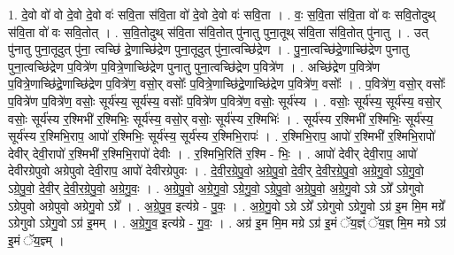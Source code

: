 \documentclass[17pt]{extarticle}
\begin{document}
1. दे॒वो वो॑ वो दे॒वो दे॒वो वः॑ सवि॒ता स॑वि॒ता वो॑ दे॒वो दे॒वो वः॑ सवि॒ता । . वः॒ स॒वि॒ता स॑वि॒ता वो॑ वः सवि॒तोदुथ् स॑वि॒ता वो॑ वः सवि॒तोत् । . स॒वि॒तोदुथ् स॑वि॒ता स॑वि॒तोत् पु॑नातु पुना॒तूथ् स॑वि॒ता स॑वि॒तोत् पु॑नातु । . उत् पु॑नातु पुना॒तूदुत् पु॑ना॒ त्वच्छि॑ द्रे॒णाच्छि॑द्रेण पुना॒तूदुत् पु॑ना॒त्वच्छि॑द्रेण । . पु॒ना॒त्वच्छि॑द्रे॒णाच्छि॑द्रेण पुनातु पुना॒त्वच्छि॑द्रेण प॒वित्रे॑ण प॒वित्रे॒णाच्छि॑द्रेण पुनातु पुना॒त्वच्छि॑द्रेण प॒वित्रे॑ण । . अच्छि॑द्रेण प॒वित्रे॑ण प॒वित्रे॒णाच्छि॑द्रे॒णाच्छि॑द्रेण प॒वित्रे॑ण॒ वसो॒र् वसोः᳚ प॒वित्रे॒णाच्छि॑द्रे॒णाच्छि॑द्रेण प॒वित्रे॑ण॒ वसोः᳚ । . प॒वित्रे॑ण॒ वसो॒र् वसोः᳚ प॒वित्रे॑ण प॒वित्रे॑ण॒ वसोः॒ सूर्य॑स्य॒ सूर्य॑स्य॒ वसोः᳚ प॒वित्रे॑ण प॒वित्रे॑ण॒ वसोः॒ सूर्य॑स्य । . वसोः॒ सूर्य॑स्य॒ सूर्य॑स्य॒ वसो॒र् वसोः॒ सूर्य॑स्य र॒श्मिभी॑ र॒श्मिभिः॒ सूर्य॑स्य॒ वसो॒र् वसोः॒ सूर्य॑स्य र॒श्मिभिः॑ । . सूर्य॑स्य र॒श्मिभी॑ र॒श्मिभिः॒ सूर्य॑स्य॒ सूर्य॑स्य र॒श्मिभि॒राप॒ आपो॑ र॒श्मिभिः॒ सूर्य॑स्य॒ सूर्य॑स्य र॒श्मिभि॒रापः॑ । . र॒श्मिभि॒राप॒ आपो॑ र॒श्मिभी॑ र॒श्मिभि॒रापो॑ देवीर् देवी॒रापो॑ र॒श्मिभी॑ र॒श्मिभि॒रापो॑ देवीः । . र॒श्मिभि॒रिति॑ र॒श्मि - भिः॒ । . आपो॑ देवीर् देवी॒राप॒ आपो॑ देवीरग्रेपुवो अग्रेपुवो देवी॒राप॒ आपो॑ देवीरग्रेपुवः । . दे॒वी॒र॒ग्रे॒पु॒वो॒ अ॒ग्रे॒पु॒वो॒ दे॒वी॒र् दे॒वी॒र॒ग्रे॒पु॒वो॒ अ॒ग्रे॒गु॒वो॒ ऽग्रे॒गु॒वो॒ ऽग्रे॒पु॒वो॒ दे॒वी॒र् दे॒वी॒र॒ग्रे॒पु॒वो॒ अ॒ग्रे॒गु॒वः॒ । . अ॒ग्रे॒पु॒वो॒ अ॒ग्रे॒गु॒वो॒ ऽग्रे॒गु॒वो॒ ऽग्रे॒पु॒वो॒ अ॒ग्रे॒पु॒वो॒ अ॒ग्रे॒गु॒वो ऽग्रे ऽग्रे᳚ ऽग्रेगुवो ऽग्रेपुवो अग्रेपुवो अग्रेगु॒वो ऽग्रे᳚ । . अ॒ग्रे॒पु॒व॒ इत्य॑ग्रे - पु॒वः॒ । . अ॒ग्रे॒गु॒वो ऽग्रे ऽग्रे᳚ ऽग्रेगुवो ऽग्रेगु॒वो ऽग्र॑ इ॒म मि॒म मग्रे᳚ ऽग्रेगुवो ऽग्रेगु॒वो ऽग्र॑ इ॒मम् । . अ॒ग्रे॒गु॒व॒ इत्य॑ग्रे - गु॒वः॒ । . अग्र॑ इ॒म मि॒म मग्रे ऽग्र॑ इ॒मं ॅय॒ज्ञ्ं ॅय॒ज्ञ् मि॒म मग्रे ऽग्र॑ इ॒मं ॅय॒ज्ञ्म् । \newline
\end{document}
